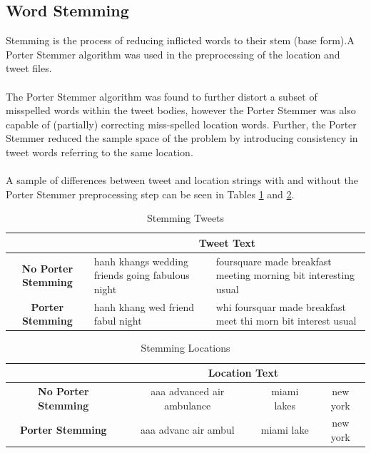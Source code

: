 \documentclass[11pt,a4paper]{article}
\begin{document}
\subsection{Word Stemming}

Stemming is the process of reducing inflicted words to their stem (base form).A Porter Stemmer algorithm was used in the preprocessing of the location and tweet files. \\\\
The Porter Stemmer algorithm was found to further distort a subset of misspelled words within the tweet bodies, however the Porter Stemmer was also capable of (partially) correcting miss-spelled location words. Further, the Porter Stemmer reduced the sample space of the problem by introducing consistency in tweet words referring to the same location.\\\\
A sample of differences between tweet and location strings with and without the Porter Stemmer preprocessing step can be seen in Tables \ref{table:stem-tweet} and \ref{table:stem-location}.
   
\begin{table} [h]
\caption{Stemming Tweets}
\begin{center}
	\begin{tabular}{| c | p{5.5cm} | p{5.5cm} |}
	\hline
	  & \multicolumn{2}{|c|}{\textbf{Tweet Text}}\\
	\hline
	\textbf{No Porter Stemming} &  hanh khangs wedding friends going fabulous night & foursquare made breakfast meeting morning bit interesting usual\\
	\hline
	\textbf{Porter Stemming}  & hanh khang wed friend fabul night & whi foursquar made breakfast meet thi morn bit interest usual\\
	\hline
	\end{tabular}
\end{center}
\label{table:stem-tweet}
\end{table}

\begin{table} [h]
\caption{Stemming Locations}
\begin{center}
	\begin{tabular}{| c | c | c | c | }
	\hline
	 &  \multicolumn{3}{|c|}{\textbf{Location Text}}\\
	\hline
	\textbf{No Porter Stemming} & aaa advanced air ambulance
& miami lakes & new york\\
	\hline
	\textbf{Porter Stemming} &  aaa advanc air ambul
& miami lake & new york\\
	\hline
	\end{tabular}
\end{center}
\label{table:stem-location}
\end{table}
\end{document}
